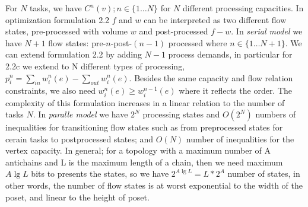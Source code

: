 For $N$ tasks, we have $C^n(v); n\in\{1\dots N\}$ for $N$ different processing capacities. In optimization formulation 2.2 $f$ and $w$ can be interpreted as two different flow states, pre-processed with volume $w$ and post-processed $f-w$.  In \emph{serial model} we have $N+1$ flow states: pre-$n$-post-$(n-1)$ processed where $ n\in\{1\dots N+1\}$. We can extend formulation 2.2 by adding $N-1$ process demands, in particular for 2.2c we extend to N different types of processing, $p_i^n= \sum\limits_{in} w_i^n(e) - \sum\limits_{out} w_i^n(e)$. Besides the same capacity and flow relation constraints, we also need $w_i^n(e) \geq w_i^{n-1}(e)$ where it reflects the order. The complexity of this formulation increases in a linear relation to the number of tasks $N$. 
In \emph{paralle model} we have $2^N$ processing states and $O(2^N)$ numbers of inequalities for transitioning flow states such as from preprocessed states for cerain tasks to postprocessed states; and $O(N)$ number of inequalities for the vertex capacity.
In general; for a topology with a maximum number of A antichains and L is the maximum length of a chain, then we need maximum $A \lg L$ bits to presents the states, so we have $2^{A \lg L} = L*2^A$ number of states, in other words, the number of flow states is at worst exponential to the width of the poset, and linear to  the height of poset.









